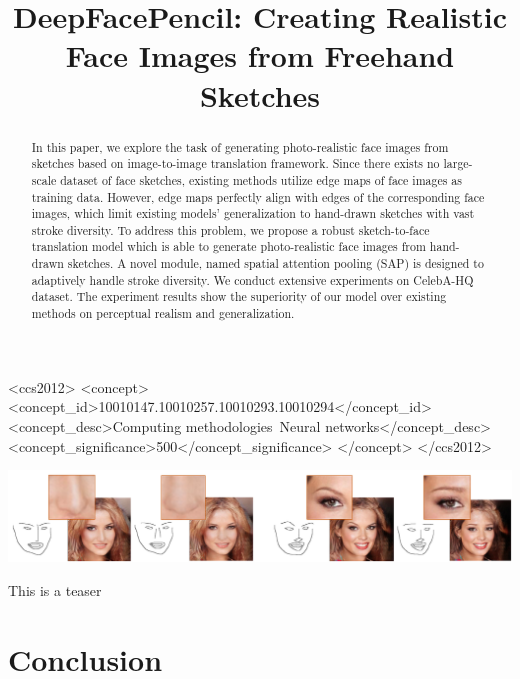 \documentclass[sigconf,anonymous,review]{acmart}
\begin{document}
\title{DeepFacePencil: Creating Realistic Face Images from Freehand Sketches}

\begin{abstract}
In this paper, we explore the task of generating photo-realistic face images from sketches based on image-to-image translation framework. 
Since there exists no large-scale dataset of face sketches, existing methods utilize edge maps of face images as training data. However, edge maps perfectly align with edges of the corresponding face images, which limit existing models' generalization to hand-drawn sketches with vast stroke diversity. 
To address this problem, we propose a robust sketch-to-face translation model which is able to generate photo-realistic face images from hand-drawn sketches. 
A novel module, named spatial attention pooling (SAP) is designed to adaptively handle stroke diversity.
We conduct extensive experiments on CelebA-HQ dataset. The experiment results show the superiority of our model over existing methods on perceptual realism and generalization.
\end{abstract}

%
\begin{CCSXML}
	<ccs2012>
	<concept>
	<concept_id>10010147.10010257.10010293.10010294</concept_id>
	<concept_desc>Computing methodologies~Neural networks</concept_desc>
	<concept_significance>500</concept_significance>
	</concept>
	</ccs2012>
\end{CCSXML}



%
%



\begin{teaserfigure}
	\includegraphics[width=\textwidth]{figs/teaser.png}
	\caption{This is a teaser}
	\label{fig:teaser}
\end{teaserfigure}


\maketitle







\section{Conclusion}


\balance 

%
\end{document}
